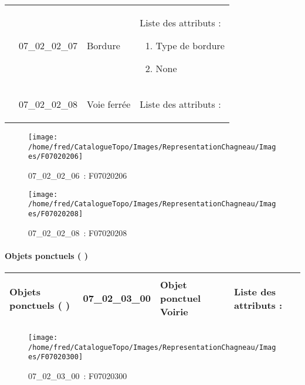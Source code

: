 \documentclass[12pt,titlepage,oneside]{book}
\begin{document}
\begin{supertabular}{|p{10cm}|c|p{13cm}|p{12cm}|}
                    & 07\_02\_02\_07 & Bordure & Liste des attributs :
\begin{enumerate}
  \item Type de bordure  \item None\end{enumerate}
\\


                    & 07\_02\_02\_08 & Voie ferrée & Liste des attributs :
\begin{enumerate}
\end{enumerate}
\\
\hline
\end{supertabular}
\begin{figure}[h!]
  \hfill         %
  \begin{minipage}[t]{3cm}
    \begin{center}
      \texttt{[image: /home/fred/CatalogueTopo/Images/RepresentationChagneau/Images/F07020206]}
      \caption[~07\_02\_02\_06]{\small{07\_02\_02\_06~:} \tiny{F07020206}}\label{F07020206}
    \end{center}
  \end{minipage}
  \begin{minipage}[t]{3cm}
    \begin{center}
      \texttt{[image: /home/fred/CatalogueTopo/Images/RepresentationChagneau/Images/F07020208]}
      \caption[~07\_02\_02\_08]{\small{07\_02\_02\_08~:} \tiny{F07020208}}\label{F07020208}
    \end{center}
  \end{minipage}
\end{figure}


\paragraph{Objets ponctuels ( )}
\noindent
\vspace{\baselineskip}

\renewcommand{\arraystretch}{1.2}
\begin{supertabular}{|p{10cm}|c|p{13cm}|p{12cm}|}
 Objets ponctuels ( ) & 07\_02\_03\_00 & Objet ponctuel Voirie & Liste des attributs :
\begin{enumerate}
\end{enumerate}
\\
\hline
\end{supertabular}
\begin{figure}[h!]
  \hfill         %
  \begin{minipage}[t]{3cm}
    \begin{center}
      \texttt{[image: /home/fred/CatalogueTopo/Images/RepresentationChagneau/Images/F07020300]}
      \caption[~07\_02\_03\_00]{\small{07\_02\_03\_00~:} \tiny{F07020300}}\label{F07020300}
    \end{center}
  \end{minipage}
\end{figure}
\end{document}
